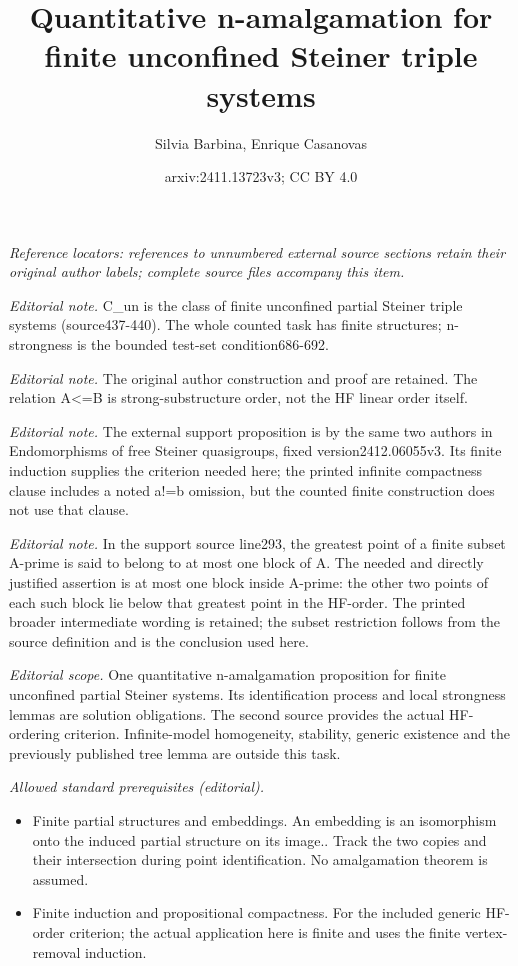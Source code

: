 \documentclass[10pt,a4paper]{article}
\title{Quantitative n-amalgamation for finite unconfined Steiner triple systems}
\author{Silvia Barbina, Enrique Casanovas}
\date{arxiv:2411.13723v3; CC BY 4.0}
\theoremstyle{note}
\begin{document}
\noindent\textit{Reference locators: references to unnumbered external source sections retain their original author labels; complete source files accompany this item.}\par
\maketitle
\noindent\textit{Editorial note.} C\_un is the class of finite unconfined partial Steiner triple systems (source437-440). The whole counted task has finite structures; n-strongness is the bounded test-set condition686-692.\par\medskip
\noindent\textit{Editorial note.} The original author construction and proof are retained. The relation A<=B is strong-substructure order, not the HF linear order itself.\par\medskip
\noindent\textit{Editorial note.} The external support proposition is by the same two authors in Endomorphisms of free Steiner quasigroups, fixed version2412.06055v3. Its finite induction supplies the criterion needed here; the printed infinite compactness clause includes a noted a!=b omission, but the counted finite construction does not use that clause.\par\medskip
\noindent\textit{Editorial note.} In the support source line293, the greatest point of a finite subset A-prime is said to belong to at most one block of A. The needed and directly justified assertion is at most one block inside A-prime: the other two points of each such block lie below that greatest point in the HF-order. The printed broader intermediate wording is retained; the subset restriction follows from the source definition and is the conclusion used here.\par\medskip
\noindent\textit{Editorial scope.} One quantitative n-amalgamation proposition for finite unconfined partial Steiner systems. Its identification process and local strongness lemmas are solution obligations. The second source provides the actual HF-ordering criterion. Infinite-model homogeneity, stability, generic existence and the previously published tree lemma are outside this task.\par\medskip
\noindent\textit{Allowed standard prerequisites (editorial).}\begin{itemize}
\item Finite partial structures and embeddings. An embedding is an isomorphism onto the induced partial structure on its image.. Track the two copies and their intersection during point identification. No amalgamation theorem is assumed.
\item Finite induction and propositional compactness. For the included generic HF-order criterion; the actual application here is finite and uses the finite vertex-removal induction.
\end{itemize}\medskip
\end{document}
